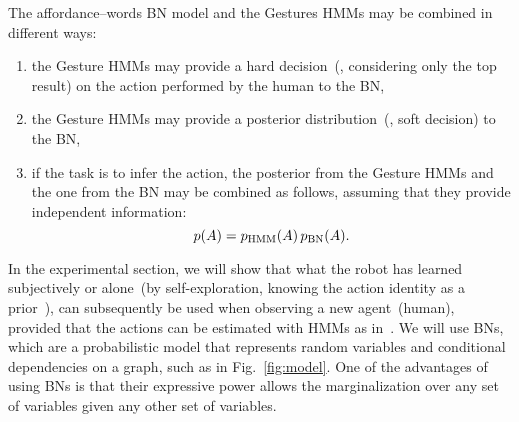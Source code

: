 The affordance--words \ac{BN} model and the Gestures \acp{HMM} may be combined in different ways:
\begin{enumerate}
\item the Gesture \acp{HMM} may provide a hard decision~(\ie, considering only the top result) on the action performed by the human to the \ac{BN},

\item the Gesture \acp{HMM} may provide a posterior distribution~(\ie, soft decision) to the \ac{BN},

\item if the task is to infer the action, the posterior from the Gesture \acp{HMM} and the one from the \ac{BN} may be combined as follows, assuming that they provide independent information:
\begin{equation*}
p(A) = p_{\text{HMM}}(A) \, p_{\text{BN}}(A).
\end{equation*}
\end{enumerate}

%

%
%
%

In the experimental section, we will show that what the robot has learned subjectively or alone~(by self-exploration, knowing the action identity as a prior~\cite{salvi:2012:smcb}), can subsequently be used when observing a new agent~(human), provided that the actions can be estimated with \acp{HMM} as in~\cite{saponaro:2013:crhri}. We will use \acfp{BN}, which are a probabilistic model that represents random variables and conditional dependencies on a graph, such as in Fig.~\ref{fig:model}. One of the advantages of using \acp{BN} is that their expressive power allows the marginalization over any set of variables given any other set of variables.
